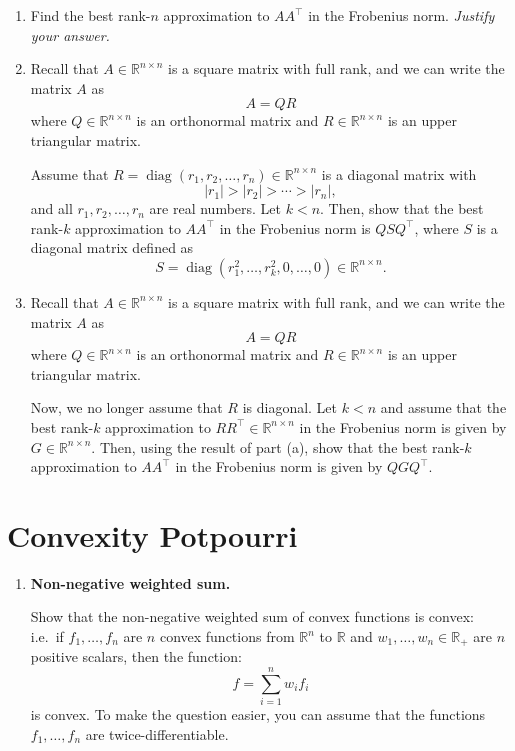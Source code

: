 \documentclass[10pt]{article}
\theoremstyle{definition}
\theoremstyle{plain}
\newcommand{\RR}{\mathbb{R}}
\DeclareMathOperator{\diag}{diag}
\begin{document}
\begin{enumerate}[label=(\alph*), resume]
    \item Find the best rank-$n$ approximation to $AA^\top$ in the Frobenius norm. \emph{Justify your answer.}

    \item Recall that $A \in \RR^{n \times n}$ is a square matrix with full rank, and we can write the matrix $A$ as
    \begin{equation}
        A = QR
    \end{equation}
    where $Q \in \RR^{n \times n}$ is an orthonormal matrix and $R \in \RR^{n \times n}$ is an upper triangular matrix.

    Assume that $R = \diag(r_1, r_2, \ldots, r_n) \in \RR^{n \times n}$ is a diagonal matrix with
    \[
        |r_1| > |r_2| > \cdots > |r_n|,
    \]
    and all $r_1, r_2, \ldots, r_n$ are real numbers. Let $k < n$. Then, show that the best rank-$k$ approximation to $AA^\top$ in the Frobenius norm is $QSQ^\top$, where $S$ is a diagonal matrix defined as
    \[
        S = \diag(r_1^2, \ldots, r_k^2, 0, \ldots, 0) \in \RR^{n \times n}.
    \]

    \item Recall that $A \in \RR^{n \times n}$ is a square matrix with full rank, and we can write the matrix $A$ as
    \begin{equation}
        A = QR
    \end{equation}
    where $Q \in \RR^{n \times n}$ is an orthonormal matrix and $R \in \RR^{n \times n}$ is an upper triangular matrix.

    Now, we no longer assume that $R$ is diagonal. Let $k < n$ and assume that the best rank-$k$ approximation to $RR^\top \in \RR^{n \times n}$ in the Frobenius norm is given by $G \in \RR^{n \times n}$. Then, using the result of part (a), show that the best rank-$k$ approximation to $AA^\top$ in the Frobenius norm is given by $QGQ^\top$.
\end{enumerate}

\section{Convexity Potpourri}

\begin{enumerate}[label=(\alph*)]
    \item \textbf{Non-negative weighted sum.}

    Show that the non-negative weighted sum of convex functions is convex: i.e.\ if $f_1, \ldots, f_n$ are $n$ convex functions from $\RR^n$ to $\RR$ and $w_1, \ldots, w_n \in \RR_+$ are $n$ positive scalars, then the function:
    \begin{equation}
        f = \sum_{i=1}^{n} w_i f_i
    \end{equation}
    is convex. To make the question easier, you can assume that the functions $f_1, \ldots, f_n$ are twice-differentiable.
\end{enumerate}
\end{document}
